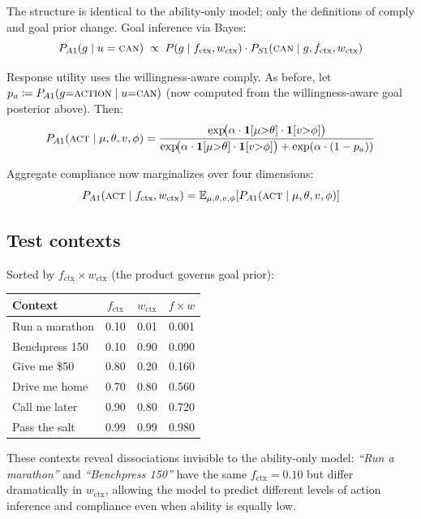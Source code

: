 \documentclass[11pt]{article}
\begin{document}
The structure is identical to the ability-only model; only the definitions of
comply and goal prior change. Goal inference via Bayes:
\[
  P_{A1}(g \mid u = \textsc{can}) \;\propto\; P(g \mid f_{\text{ctx}}, w_{\text{ctx}})\cdot P_{S1}(\textsc{can} \mid g, f_{\text{ctx}}, w_{\text{ctx}})
\]

Response utility uses the willingness-aware comply. As before, let
$p_a \coloneqq P_{A1}(g{=}\textsc{action} \mid u{=}\textsc{can})$ (now computed
from the willingness-aware goal posterior above). Then:
\[
  P_{A1}(\textsc{act} \mid \mu, \theta, v, \phi) =
  \frac{\exp\!\bigl(\alpha\cdot\mathbf{1}[\mu{>}\theta]\cdot\mathbf{1}[v{>}\phi]\bigr)}
       {\exp\!\bigl(\alpha\cdot\mathbf{1}[\mu{>}\theta]\cdot\mathbf{1}[v{>}\phi]\bigr) + \exp(\alpha\cdot(1-p_a))}
\]

Aggregate compliance now marginalizes over four dimensions:
\[
  P_{A1}(\textsc{act} \mid f_{\text{ctx}}, w_{\text{ctx}}) =
  \mathbb{E}_{\mu, \theta, v, \phi}\!\left[P_{A1}(\textsc{act} \mid \mu, \theta, v, \phi)\right]
\]

\subsection{Test contexts}

Sorted by $f_{\text{ctx}} \times w_{\text{ctx}}$ (the product governs goal prior):

\begin{center}
\renewcommand{\arraystretch}{1.2}
\begin{tabular}{lccc}
\toprule
\textbf{Context} & $f_{\text{ctx}}$ & $w_{\text{ctx}}$ & $f \times w$ \\
\midrule
Run a marathon   & 0.10 & 0.01 & 0.001 \\
Benchpress 150   & 0.10 & 0.90 & 0.090 \\
Give me \$50     & 0.80 & 0.20 & 0.160 \\
Drive me home    & 0.70 & 0.80 & 0.560 \\
Call me later    & 0.90 & 0.80 & 0.720 \\
Pass the salt    & 0.99 & 0.99 & 0.980 \\
\bottomrule
\end{tabular}
\end{center}

These contexts reveal dissociations invisible to the ability-only model:
\emph{``Run a marathon''} and \emph{``Benchpress 150''} have the same $f_{\text{ctx}} = 0.10$
but differ dramatically in $w_{\text{ctx}}$, allowing the model to predict
different levels of action inference and compliance even when ability is equally
low.
\end{document}
